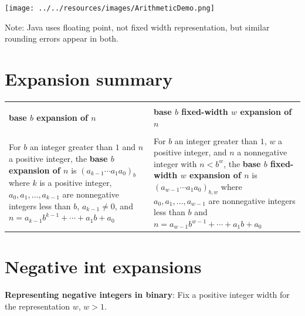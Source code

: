 \documentclass[12pt, oneside]{article}
\begin{document}
\texttt{[image: ../../resources/images/ArithmeticDemo.png]}

Note: Java uses floating point, not fixed width representation, but similar rounding errors appear in both.
 \vfill
\section*{Expansion summary}


\begin{center}
    \begin{tabular}{|p{3.7in}|p{3.7in}|}
    \hline 
    &   \\
    {\bf base $b$ expansion of $n$}  & {\bf base $b$ fixed-width $w$ expansion of $n$}  \\
    & \\
    \hline  
    For $b$ an integer greater than $1$ and $n$ a positive integer, 
    the {\bf base $b$ expansion of $n$}  is $(a_{k-1} \cdots a_1 a_0)_b$
    where $k$ is a positive integer, $a_0, a_1, \ldots, a_{k-1}$ are nonnegative integers 
    less than $b$, $a_{k-1} \neq  0$, and $n =  a_{k-1} b^{k-1} + \cdots + a_1b + a_0$
    & 
    For $b$ an integer greater than $1$, $w$ a positive integer, and $n$ a nonnegative integer
    with $n <  b^w$, the {\bf base $b$ fixed-width $w$ expansion of $n$}  is
    $(a_{w-1} \cdots a_1 a_0)_{b,w}$
    where  $a_0, a_1, \ldots, a_{w-1}$ are nonnegative integers less than $b$ and 
    $n =  a_{w-1} b^{w-1} + \cdots + a_1b + a_0$\\
    \hline
    \end{tabular}
\end{center} \vfill
\section*{Negative int expansions}


{\bf Representing negative integers in binary}: Fix a positive integer  width for the representation  $w$, $w >1$.
\end{document}
